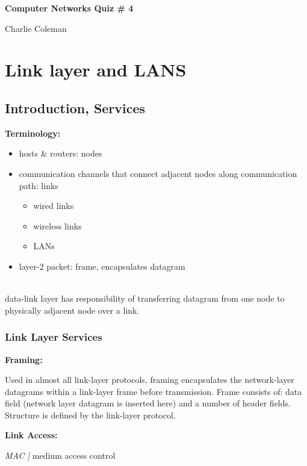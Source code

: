 \documentclass{article}
\newcommand{\topic}[1]{\noindent\textbf{#1}}
\newcommand{\define}[1]{\noindent\textit{#1 |}}
\begin{document}
\begin{center}
	\begin{large} \textbf{Computer Networks Quiz \# 4} \end{large}
\end{center}

\hfill Charlie Coleman

\setcounter{section}{5}
\section{Link layer and LANS}

\subsection{Introduction, Services}

\topic{Terminology:}

\begin{itemize}
	\item hosts \& routers: nodes
	\item communication channels that connect adjacent nodes along communication path: links
		\begin{itemize}
			\item wired links
			\item wireless links
			\item LANs
		\end{itemize}
	\item layer-2 packet: frame, encapsulates datagram
\end{itemize}~\\

\noindent data-link layer has responsibility of transferring datagram from one node to physically adjacent node over a link.

\subsubsection*{Link Layer Services}

\topic{Framing:}

Used in almost all link-layer protocols, framing encapsulates the network-layer datagrams within a link-layer frame before transmission. Frame consists of: data field (network layer datagram is inserted here) and a number of header fields. Structure is defined by the link-layer protocol.

\topic{Link Access:}

\define{MAC} medium access control
\end{document}
